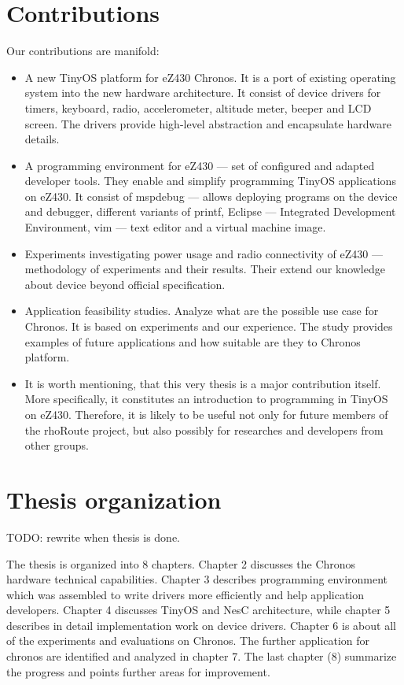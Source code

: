 \section{Contributions}
Our contributions are manifold:
\begin{itemize}
  \item A new TinyOS platform for eZ430 Chronos.
It is a port of existing operating system into the new hardware architecture.
It consist of device drivers for timers, keyboard, radio, accelerometer, altitude meter, beeper and LCD screen.
The drivers provide high-level abstraction and encapsulate hardware details.
  \item A programming environment for eZ430 --- set of configured and adapted developer tools. They enable and simplify programming TinyOS applications on eZ430. It consist of mspdebug --- allows deploying programs on the device and debugger, different variants of printf, Eclipse --- Integrated Development Environment, vim --- text editor and a virtual machine image.
  \item Experiments investigating power usage and radio connectivity of eZ430 --- methodology of experiments and their results. Their extend our knowledge about device beyond official specification.
  \item Application feasibility studies. Analyze what are the possible use case for Chronos. It is based on experiments and our experience. The study provides examples of future applications and how suitable are they to Chronos platform.
  \item It is worth mentioning, that this very thesis is a major contribution itself. More specifically, it constitutes an introduction to programming in TinyOS on eZ430. Therefore, it is likely to be useful not only for future members of the rhoRoute project, but also possibly for researches and developers from other groups.
\end{itemize}

\section{Thesis organization}
TODO: rewrite when thesis is done.

The thesis is organized into 8 chapters. Chapter 2 discusses the Chronos hardware technical capabilities. Chapter 3 describes programming environment which was assembled to write drivers more efficiently and help application developers. Chapter 4 discusses TinyOS and NesC architecture, while chapter 5 describes in detail implementation work on device drivers. Chapter 6 is about all of the experiments and evaluations on Chronos. The further application for chronos are identified and analyzed in chapter 7. The last chapter (8) summarize the progress and points further areas for improvement.
